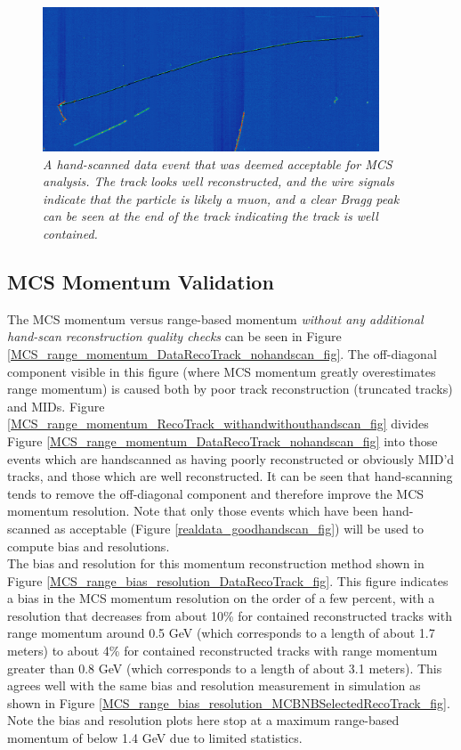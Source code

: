 \begin{figure}[ht!]
\begin{center}
\includegraphics[width=100mm]{Figures/static_figs/good_evd_1.png}
\end{center}
\caption{\textit{A hand-scanned data event that was deemed acceptable for MCS analysis. The track looks well reconstructed, and the wire signals indicate that the particle is likely a muon, and a clear Bragg peak can be seen at the end of the track indicating the track is well contained.}}
\label{good_evd_fig_1}
\end{figure}

\subsection{MCS Momentum Validation}\label{MCS_Momentum_Validation_DataRecoTrack_section}
The MCS momentum versus range-based momentum \textit{without any additional hand-scan reconstruction quality checks} can be seen in Figure \ref{MCS_range_momentum_DataRecoTrack_nohandscan_fig}. The off-diagonal component visible in this figure (where MCS momentum greatly overestimates range momentum) is caused both by poor track reconstruction (truncated tracks) and MIDs. Figure \ref{MCS_range_momentum_RecoTrack_withandwithouthandscan_fig} divides Figure \ref{MCS_range_momentum_DataRecoTrack_nohandscan_fig} into those events which are handscanned as having poorly reconstructed or obviously MID'd tracks, and those which are well reconstructed. It can be seen that hand-scanning tends to remove the off-diagonal component and therefore improve the MCS momentum resolution. Note that only those events which have been hand-scanned as acceptable (Figure \ref{realdata_goodhandscan_fig}) will be used to compute bias and resolutions.\\

The bias and resolution for this momentum reconstruction method shown in Figure \ref{MCS_range_bias_resolution_DataRecoTrack_fig}. This figure indicates a bias in the MCS momentum resolution on the order of a few percent, with a resolution that decreases from about 10\% for contained reconstructed tracks with range momentum around 0.5 GeV (which corresponds to a length of about 1.7 meters) to about 4\% for contained reconstructed tracks with range momentum greater than 0.8 GeV (which corresponds to a length of about 3.1 meters). This agrees well with the same bias and resolution measurement in simulation as shown in Figure \ref{MCS_range_bias_resolution_MCBNBSelectedRecoTrack_fig}. Note the bias and resolution plots here stop at a maximum range-based momentum of below 1.4 GeV due to limited statistics.


